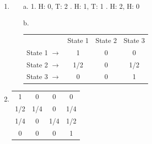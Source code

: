 {\begin{enumerate}
        \item
            \begin{itemize}
                \item[a.]   
                    1. H: 0, T: 2   . H: 1, T: 1   . H: 2, H: 0
                \item[b.]   
                    \begin{tabular}{l c c c}
                        & State 1 & State 2 & State 3
                        \\
                        State 1 $\to$ &
                            1 & 0 & 0 
                        \\
                        State 2 $\to$ &
                            1/2 & 0 & 1/2
                        \\
                        State 3 $\to$ &
                            0 & 0 & 1
                    \end{tabular}
            \end{itemize}

        \item   
            \begin{tabular}{| c c c c |}
                1 & 0 & 0 & 0
                \\
                1/2 & 1/4 & 0 & 1/4
                \\
                1/4 & 0 & 1/4 & 1/2
                \\
                0 & 0 & 0 & 1
            \end{tabular}
    \end{enumerate}

}



